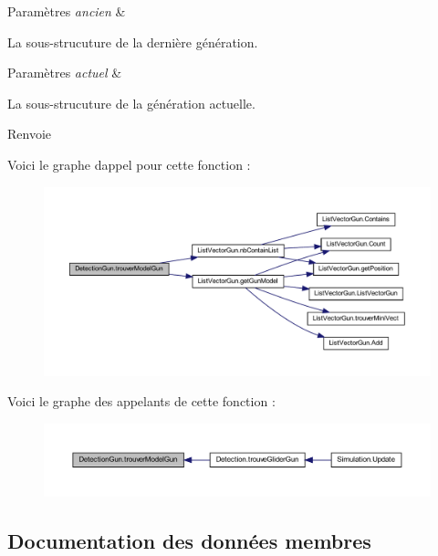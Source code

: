\begin{DoxyParams}{Paramètres}
{\em ancien} & \\
\hline
\end{DoxyParams}
La sous-\/strucuture de la dernière génération. 
\begin{DoxyParams}{Paramètres}
{\em actuel} & \\
\hline
\end{DoxyParams}
La sous-\/strucuture de la génération actuelle. \begin{DoxyReturn}{Renvoie}

\end{DoxyReturn}
Voici le graphe d\textquotesingle{}appel pour cette fonction \+:
\nopagebreak
\begin{figure}[H]
\begin{center}
\leavevmode
\includegraphics[width=350pt]{class_detection_gun_aaafe20e9ecbfe9e95e2f36ac49701d3d_cgraph}
\end{center}
\end{figure}
Voici le graphe des appelants de cette fonction \+:
\nopagebreak
\begin{figure}[H]
\begin{center}
\leavevmode
\includegraphics[width=350pt]{class_detection_gun_aaafe20e9ecbfe9e95e2f36ac49701d3d_icgraph}
\end{center}
\end{figure}


\subsection{Documentation des données membres}
\mbox{\label{class_detection_gun_a61b7a92ce8bf0837449e3e98c344ce1c}} 
